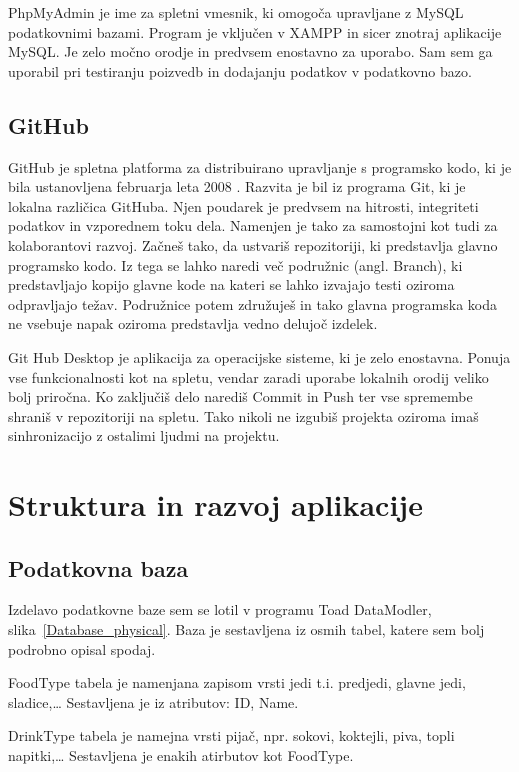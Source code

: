 \documentclass[a4paper, 12pt]{book}
\begin{document}
PhpMyAdmin je ime za spletni vmesnik, ki omogoča upravljane z MySQL podatkovnimi bazami. Program je vključen v XAMPP in sicer znotraj aplikacije MySQL. Je zelo močno orodje in predvsem enostavno za uporabo. Sam sem ga uporabil pri testiranju poizvedb in dodajanju podatkov v podatkovno bazo.

\section {GitHub}
GitHub je spletna platforma za distribuirano upravljanje s programsko kodo, ki je bila ustanovljena februarja leta 2008 \cite{GitHub}. Razvita je bil iz programa Git, ki je lokalna različica GitHuba. Njen poudarek je predvsem na hitrosti, integriteti podatkov in vzporednem toku dela. Namenjen je tako za samostojni kot tudi za kolaborantovi razvoj. Začneš tako, da ustvariš repozitoriji, ki predstavlja glavno programsko kodo. Iz tega se lahko naredi več podružnic (angl. Branch), ki predstavljajo kopijo glavne kode na kateri se lahko izvajajo testi oziroma odpravljajo težav. Podružnice potem združuješ in tako glavna programska koda ne vsebuje napak oziroma predstavlja vedno delujoč izdelek. 

Git Hub Desktop je aplikacija za operacijske sisteme, ki je zelo enostavna. Ponuja vse funkcionalnosti kot na spletu, vendar zaradi uporabe lokalnih orodij veliko bolj priročna. Ko zaključiš delo narediš Commit in Push ter vse spremembe shraniš v repozitoriji na spletu. Tako nikoli ne izgubiš projekta oziroma imaš sinhronizacijo z ostalimi ljudmi na projektu. 


\chapter {Struktura in razvoj aplikacije}

\section{Podatkovna baza}
Izdelavo podatkovne baze sem se lotil v programu Toad DataModler, slika~\ref{Database_physical}. Baza je sestavljena iz osmih tabel, katere sem bolj podrobno opisal spodaj. 

FoodType tabela je namenjana zapisom vrsti jedi t.i. predjedi, glavne jedi, sladice,… Sestavljena je iz atributov: ID, Name.

DrinkType tabela je namejna vrsti pijač, npr. sokovi, koktejli, piva, topli napitki,… Sestavljena je enakih atirbutov kot FoodType.
\end{document}
